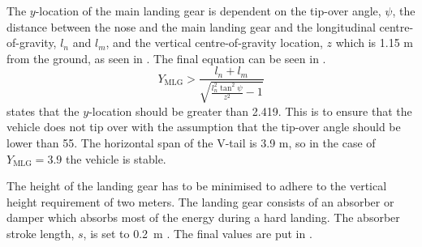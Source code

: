 The $y$-location of the main landing gear is dependent on the tip-over angle, $\psi$, the distance between the nose and the main landing gear and the longitudinal centre-of-gravity, $l_{n}$ and $l_{m}$, and the vertical centre-of-gravity location, $z$ which is 1.15 m from the ground, as seen in .
The final equation can be seen in .
\begin{equation}
    \label{eq:ylmg}
    Y_\text{MLG} > \frac{l_{n}+l_{m}}{\sqrt{\frac{l_{n}^2 \tan^2\psi}{z^2}-1}}
\end{equation}
 states that the $y$-location should be greater than 2.419.
This is to ensure that the vehicle does not tip over with the assumption that the tip-over angle should be lower than \qty{55}{\deg}\cite{ADSEEIslides}.
The horizontal span of the V-tail is 3.9 m, so in the case of $Y_\text{MLG} = 3.9$ the vehicle is stable.

The height of the landing gear has to be minimised to adhere to the vertical height requirement of two meters.
The landing gear consists of an absorber or damper which absorbs most of the energy during a hard landing.
The absorber stroke length, $s$, is set to \qty{0.2}{m} \cite{ADSEEIslides}.
The final values are put in .
\begin{table}[H]
    \centering
    \caption{Undercarriage sizing}
    \label{tab:undercarriage_values}
    
\end{table}

